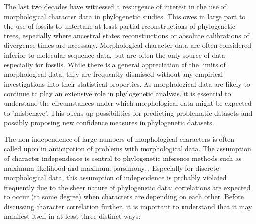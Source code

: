 \documentclass[12pt,letterpaper]{article}
\begin{document}
The last two decades have witnessed a resurgence of interest in the use of morphological character data in phylogenetic studies.
This owes in large part to the use of fossils to untertake at least partial reconstructions of phylogenetic trees, especially where ancestral states reconstructions or absolute calibrations of divergence times are necessary. 
Morphological character data are often considered inferior to molecular sequence data, but are often the only source of data---especially for fossils.
While there is a general appreciation of the limits of morphological data, they are frequently dismissed without any empirical investigations into their statistical properties.
As morphological data are likely to continue to play an extensive role in phylogenetic analysis, it is essential to understand the circumstances under which morphological data might be expected to 'misbehave'.
This opens up possibilities for predicting problematic datasets and possibly proposing new confidence measures in phylogenetic datasets.

The non-independence of large numbers of morphological characters is often called upon in anticipation of problems with morphological data.
The assumption of character independence is central to phylogenetic inference methods such as maximum likelihood and maximum parsimony. \citep[e.g.][]{joysey1982problems,felsenstein1985phylogenies,lewisa2001,felsenstein2004inferring}.
Especially for discrete morphological data, this assumption of independence is probably violated frequently due to the sheer nature of phylogenetic data: correlations are expected to occur (to some degree) when characters are depending on each other.
Before discussing character correlation further, it is important to understand that it may manifest itself in at least three distinct ways:
\end{document}
